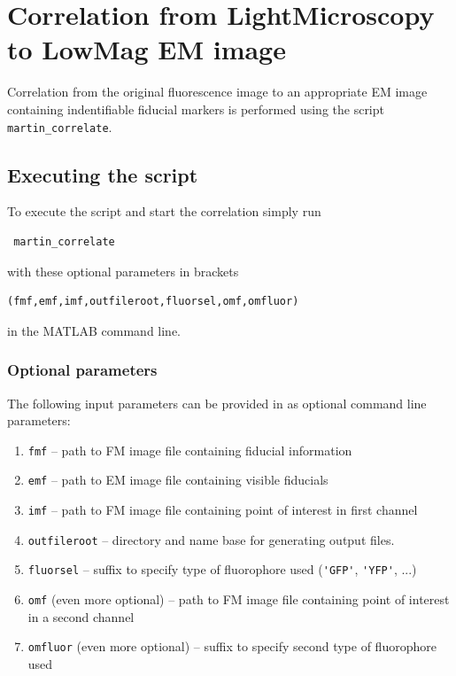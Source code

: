 \documentclass[10pt,a4paper,onepage,DIV12]{scrartcl}
\begin{document}
\newpage
 
\newpage
\section{Correlation from LightMicroscopy to LowMag EM image}

Correlation from the original fluorescence image to an appropriate EM image containing indentifiable fiducial markers is performed using the script \texttt{martin\_correlate}.

\subsection{Executing the script}
To execute the script and start the correlation simply run \begin{verbatim}
 martin_correlate\end{verbatim} with these optional parameters in brackets \begin{verbatim}(fmf,emf,imf,outfileroot,fluorsel,omf,omfluor)
\end{verbatim}
 in the MATLAB command line.
 

\subsubsection{Optional parameters}
The following input parameters can be provided in as optional command line parameters:
\begin{enumerate}
 \item\texttt{fmf} -- path to FM image file containing fiducial information
 \item\texttt{emf} -- path to EM image file containing visible fiducials
 \item\texttt{imf} -- path to FM image file containing point of interest in first channel
 \item\texttt{outfileroot} -- directory and name base for generating output files.
 \item\texttt{fluorsel} -- suffix to specify type of fluorophore used (\verb|'GFP'|, \verb|'YFP'|, ...)
 \item\texttt{omf} (even more optional) -- path to FM image file containing point of interest in a second channel
 \item\texttt{omfluor} (even more optional) -- suffix to specify second type of fluorophore used
\end{enumerate}
\newpage
\end{document}
